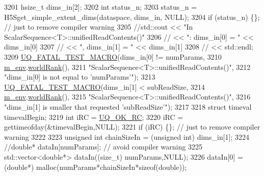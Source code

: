 \begin{DoxyCode}
3201               hsize\_t dims\_in[2];
3202               \textcolor{keywordtype}{int}     status\_n;
3203               status\_n  = H5Sget\_simple\_extent\_dims(dataspace, dims\_in, NULL);
3204               \textcolor{keywordflow}{if} (status\_n) \{\}; \textcolor{comment}{// just to remove compiler warning}
3205         \textcolor{comment}{//std::cout << "In ScalarSequence<T>::unifiedReadContents()"}
3206               \textcolor{comment}{//          << ": dims\_in[0] = " << dims\_in[0]}
3207               \textcolor{comment}{//          << ", dims\_in[1] = " << dims\_in[1]}
3208               \textcolor{comment}{//          << std::endl;}
3209               \hyperlink{_defines_8h_a56d63d18d0a6d45757de47fcc06f574d}{UQ\_FATAL\_TEST\_MACRO}(dims\_in[0] != numParams,
3210                                   \hyperlink{class_q_u_e_s_o_1_1_scalar_sequence_a71618cd6351b29361b437af68447a4c8}{m\_env}.\hyperlink{class_q_u_e_s_o_1_1_base_environment_a78b57112bbd0e6dd0e8afec00b40ffa7}{worldRank}(),
3211                                   \textcolor{stringliteral}{"ScalarSequence<T>::unifiedReadContents()"},
3212                                   \textcolor{stringliteral}{"dims\_in[0] is not equal to 'numParams'"});
3213               \hyperlink{_defines_8h_a56d63d18d0a6d45757de47fcc06f574d}{UQ\_FATAL\_TEST\_MACRO}(dims\_in[1] < subReadSize,
3214                                   \hyperlink{class_q_u_e_s_o_1_1_scalar_sequence_a71618cd6351b29361b437af68447a4c8}{m\_env}.\hyperlink{class_q_u_e_s_o_1_1_base_environment_a78b57112bbd0e6dd0e8afec00b40ffa7}{worldRank}(),
3215                                   \textcolor{stringliteral}{"ScalarSequence<T>::unifiedReadContents()"},
3216                                   \textcolor{stringliteral}{"dims\_in[1] is smaller that requested 'subReadSize'"});
3217 
3218               \textcolor{keyword}{struct }timeval timevalBegin;
3219               \textcolor{keywordtype}{int} iRC = \hyperlink{namespace_q_u_e_s_o_a8e909502900aecf24cedba022ea84471}{UQ\_OK\_RC};
3220               iRC = gettimeofday(&timevalBegin,NULL);
3221               \textcolor{keywordflow}{if} (iRC) \{\}; \textcolor{comment}{// just to remove compiler warning}
3222 
3223               \textcolor{keywordtype}{unsigned} \textcolor{keywordtype}{int} chainSizeIn = (\textcolor{keywordtype}{unsigned} int) dims\_in[1];
3224               \textcolor{comment}{//double* dataIn[numParams]; // avoid compiler warning}
3225         std::vector<double*> dataIn((\textcolor{keywordtype}{size\_t}) numParams,NULL);
3226               dataIn[0] = (\textcolor{keywordtype}{double}*) malloc(numParams*chainSizeIn*\textcolor{keyword}{sizeof}(\textcolor{keywordtype}{double}));

\end{DoxyCode}

